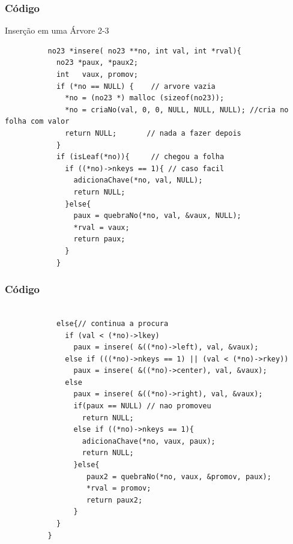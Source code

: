 \documentclass[cyan,compress,aspectratio=43]{beamer}
\begin{document}
\begin{frame}[fragile]
\frametitle{Código}
      \vspace{-0.3cm}
	\begin{block}{Inserção em uma Árvore 2-3}
		\begin{lstlisting}
		  no23 *insere( no23 **no, int val, int *rval){
 		    no23 *paux, *paux2;
 		    int   vaux, promov;
 		    if (*no == NULL) {    // arvore vazia
 		      *no = (no23 *) malloc (sizeof(no23));
 		      *no = criaNo(val, 0, 0, NULL, NULL, NULL); //cria no folha com valor
 		      return NULL;       // nada a fazer depois
 		    }
 		    if (isLeaf(*no)){     // chegou a folha
 		      if ((*no)->nkeys == 1){ // caso facil
 			    adicionaChave(*no, val, NULL);
 			    return NULL;
 		      }else{
 			    paux = quebraNo(*no, val, &vaux, NULL);
 			    *rval = vaux;
 			    return paux;
 		      }
		    }
 		\end{lstlisting}

   	\end{block}
 \end{frame}

 \begin{frame}[fragile]
 \frametitle{Código}
       \vspace{-0.3cm}
 	\begin{block}{}
 		\begin{lstlisting}

 		    else{// continua a procura
 		      if (val < (*no)->lkey)
 			    paux = insere( &((*no)->left), val, &vaux);
 		      else if (((*no)->nkeys == 1) || (val < (*no)->rkey))
 			    paux = insere( &((*no)->center), val, &vaux);
 		      else
 			    paux = insere( &((*no)->right), val, &vaux);
 		        if(paux == NULL) // nao promoveu
 		          return NULL;
 		        else if ((*no)->nkeys == 1){
 		          adicionaChave(*no, vaux, paux);
 		          return NULL;
 		        }else{
 		           paux2 = quebraNo(*no, vaux, &promov, paux);
 		           *rval = promov;
 		           return paux2;
 		        }
 		    }
 		  }
 	  \end{lstlisting}

   	\end{block}
\end{frame}
\end{document}
